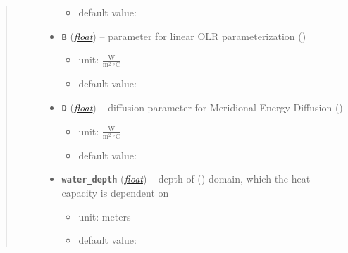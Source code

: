 \documentclass[a4paper,10pt,english]{sphinxmanual}
\begin{document}
\begin{fulllineitems}
\begin{quote}
\begin{description}
\begin{itemize}
\begin{itemize}
\item {} 
default value: 

\end{itemize}


\item {} 
\textbf{\texttt{B}} (\href{http://docs.python.org/2.7/library/functions.html\#float}{\emph{float}}) -- 
parameter for linear OLR parameterization
{\hyperref[api/climlab.radiation:climlab.radiation.AplusBT.AplusBT]{\emph{}}} ()
\begin{itemize}
\item {} 
unit: \(\frac{\textrm{W}}{\textrm{m}^2 \ ^{\circ} \textrm{C}}\)

\item {} 
default value: 

\end{itemize}


\item {} 
\textbf{\texttt{D}} (\href{http://docs.python.org/2.7/library/functions.html\#float}{\emph{float}}) -- 
diffusion parameter for Meridional Energy Diffusion
{\hyperref[api/climlab.dynamics:climlab.dynamics.diffusion.MeridionalDiffusion]{\emph{}}} ()
\begin{itemize}
\item {} 
unit: \(\frac{\textrm{W}}{\textrm{m}^2 \ ^{\circ} \textrm{C}}\)

\item {} 
default value: 

\end{itemize}


\item {} 
\textbf{\texttt{water\_depth}} (\href{http://docs.python.org/2.7/library/functions.html\#float}{\emph{float}}) -- 
depth of {\hyperref[api/climlab.domain:climlab.domain.domain.zonal_mean_surface]{\emph{}}} ()
domain, which the heat capacity is dependent on
\begin{itemize}
\item {} 
unit: meters

\item {} 
default value: 

\end{itemize}



\end{itemize}
\end{description}
\end{quote}
\end{fulllineitems}
\end{document}
